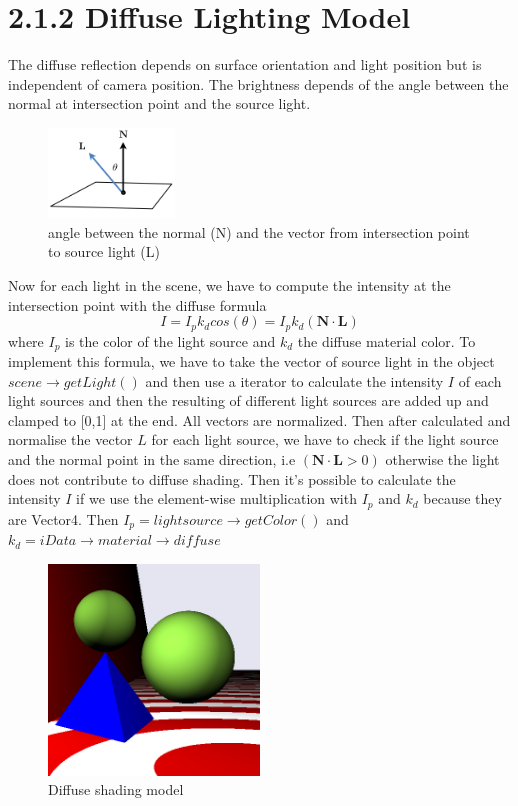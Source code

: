 \documentclass[10pt,a4paper]{report}
\begin{document}
\section*{2.1.2   Diffuse Lighting Model}
The diffuse reflection depends on surface orientation and light position but is independent of camera position. The brightness depends of the angle between the normal at intersection point and the source light.
\begin{figure}[h!]
\caption{angle between the normal (N) and the vector from intersection point to source light (L)}
  \centering
    \includegraphics[width=0.3\textwidth]{angleNL.png}
\end{figure}
Now for each light in the scene, we have to compute the intensity at the intersection point with the diffuse formula $$I = I_p k_d cos(\theta) = I_p k_d (\mathbf{N \cdot{L}})$$ where $I_p$ is the color of the light source and $k_d$ the diffuse material color. To implement this formula, we have to take the vector of source light in the object $scene \rightarrow getLight()$ and then use a iterator to calculate the intensity $I$ of each light sources and then the resulting of different light sources are added up and clamped to [0,1] at the end. All vectors are normalized. Then after calculated and normalise the vector $L$ for each light source, we have to check if the light source and the normal point in the same direction, i.e $(\mathbf{N\cdot L}>0)$ otherwise the light does not contribute to diffuse shading. Then it's possible to calculate the intensity $I$ if we use the element-wise multiplication with $I_p$ and $k_d$ because they are Vector4. Then $I_p = lightsource \rightarrow getColor()$ and $k_d = iData \rightarrow material \rightarrow diffuse$
\begin{figure}[h!]
\caption{Diffuse shading model}
  \centering
    \includegraphics[width=0.5\textwidth]{02_Exc_Raytracing_Framework/Image_Diffuse_Model.png}
\end{figure}
\end{document}
